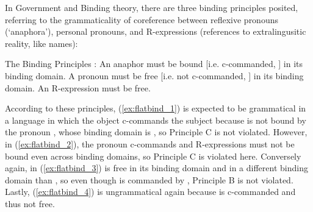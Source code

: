 In Government and Binding theory, there are three binding principles posited,
referring to the grammaticality of coreference between reflexive pronouns
(`ana\-phora'), personal pronouns, and R-expressions (references to
extralingusitic reality, like names):

\pex\label{ex:gbprinciples}
	The Binding Principles \citep[157]{carnie2013}:
	\a\label{ex:gb_a}%
		An anaphor must be bound [i.e. c-commanded, \CB] in its binding domain.
	\a\label{ex:gb_b}%
		A pronoun must be free [i.e. not c-commanded, \CB] in its binding
		domain.
	\a\label{ex:gb_c}%
		An R-expression must be free.
\xe



According to these principles, (\ref{ex:flatbind_1}) is expected to be
grammatical in a language in which the object c-commands the subject because
 is not bound by the pronoun , whose binding domain is , so Principle C is not violated. However, in (\ref{ex:flatbind_2}), the
pronoun c-commands  and R-expressions must not be bound even across
binding domains, so Principle C is violated here. Conversely again,  in
(\ref{ex:flatbind_3}) is free in its binding domain and in a different binding
domain than , so even though  is commanded by
, Principle B is not violated. Lastly, (\ref{ex:flatbind_4}) is
ungrammatical again because  is c-commanded and thus not free.

